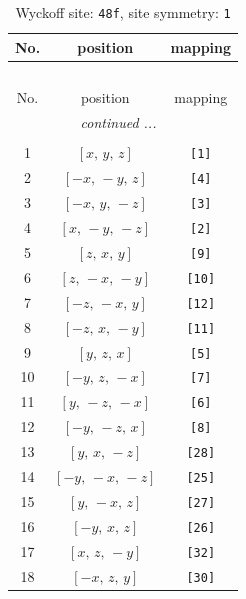 \documentclass[fleqn,8pt]{jsarticle}
\begin{document}
\renewcommand{\arraystretch}{1.2}
\begin{longtable}{ccc}
\caption{Wyckoff site: {\tt 48f}, site symmetry: {\tt 1}}
 \\
 \hline \hline
No. & position & mapping \\ \hline \endfirsthead

\multicolumn{2}{l}{\tablename\ \thetable{}} \\
 \hline \hline
No. & position & mapping \\ \hline \endhead

 \hline \hline
\multicolumn{2}{r}{\footnotesize\it continued ...} \\ \endfoot

 \hline \hline
\multicolumn{2}{r}{} \\ \endlastfoot

1 & $\left[ x,\, y,\, z \right]$ & {\tt [1]} \\ \hline
2 & $\left[ - x,\, - y,\, z \right]$ & {\tt [4]} \\ \hline
3 & $\left[ - x,\, y,\, - z \right]$ & {\tt [3]} \\ \hline
4 & $\left[ x,\, - y,\, - z \right]$ & {\tt [2]} \\ \hline
5 & $\left[ z,\, x,\, y \right]$ & {\tt [9]} \\ \hline
6 & $\left[ z,\, - x,\, - y \right]$ & {\tt [10]} \\ \hline
7 & $\left[ - z,\, - x,\, y \right]$ & {\tt [12]} \\ \hline
8 & $\left[ - z,\, x,\, - y \right]$ & {\tt [11]} \\ \hline
9 & $\left[ y,\, z,\, x \right]$ & {\tt [5]} \\ \hline
10 & $\left[ - y,\, z,\, - x \right]$ & {\tt [7]} \\ \hline
11 & $\left[ y,\, - z,\, - x \right]$ & {\tt [6]} \\ \hline
12 & $\left[ - y,\, - z,\, x \right]$ & {\tt [8]} \\ \hline
13 & $\left[ y,\, x,\, - z \right]$ & {\tt [28]} \\ \hline
14 & $\left[ - y,\, - x,\, - z \right]$ & {\tt [25]} \\ \hline
15 & $\left[ y,\, - x,\, z \right]$ & {\tt [27]} \\ \hline
16 & $\left[ - y,\, x,\, z \right]$ & {\tt [26]} \\ \hline
17 & $\left[ x,\, z,\, - y \right]$ & {\tt [32]} \\ \hline
18 & $\left[ - x,\, z,\, y \right]$ & {\tt [30]} \\ \hline

\end{longtable}
\end{document}
